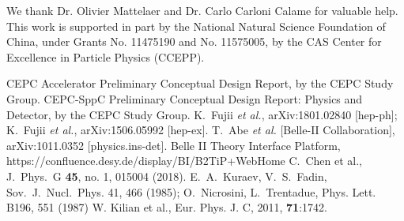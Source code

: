 \documentclass[a4paper,11pt]{article}
\begin{document}
\acknowledgments
We thank Dr. Olivier Mattelaer and Dr. Carlo Carloni Calame for valuable help. This work is supported in part by the National Natural Science Foundation of China, under Grants No. 11475190 and No. 11575005,  by the CAS Center for Excellence in Particle Physics (CCEPP).

\appendix


\begin{thebibliography}{00}




 CEPC Accelerator Preliminary Conceptual Design Report, by the CEPC Study Group.
 CEPC-SppC Preliminary Conceptual Design Report: Physics and Detector, by the CEPC Study Group.
  K.~Fujii {\it et al.},
  arXiv:1801.02840 [hep-ph];
K.~Fujii {\it et al.},
  arXiv:1506.05992 [hep-ex].
  T.~Abe {\it et al.} [Belle-II Collaboration],
  arXiv:1011.0352 [physics.ins-det].
 Belle II Theory Interface Platform, https://confluence.desy.de/display/BI/B2TiP+WebHome
  C.~Chen et al.,
  J.\ Phys.\ G {\bf 45}, no. 1, 015004 (2018).
 E.~A.~Kuraev, V.~S.~Fadin, Sov.~J.~Nucl.~Phys. 41, 466 (1985); O.~Nicrosini, L.~Trentadue, Phys. Lett. B196, 551 (1987)
W. Kilian et al., Eur. Phys. J. C, 2011, {\bf 71}:1742.


\end{thebibliography}
\end{document}
